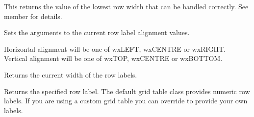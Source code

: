 \label{wxgridgetorcreatecellattr}




\label{wxgridgetrowminimalacceptableheight}


This returns the value of the lowest row width that can be handled correctly. See
member  for details.



\label{wxgridgetrowminimalheight}




\label{wxgridgetrowlabelalignment}


Sets the arguments to the current row label alignment values.

Horizontal alignment will be one of wxLEFT, wxCENTRE or wxRIGHT. \\
Vertical alignment will be one of wxTOP, wxCENTRE or wxBOTTOM.




\label{wxgridgetrowlabelsize}


Returns the current width of the row labels.



\label{wxgridgetrowlabelvalue}


Returns the specified row label. The default grid table class provides numeric row labels.
If you are using a custom grid table you can override
 to provide
your own labels.



